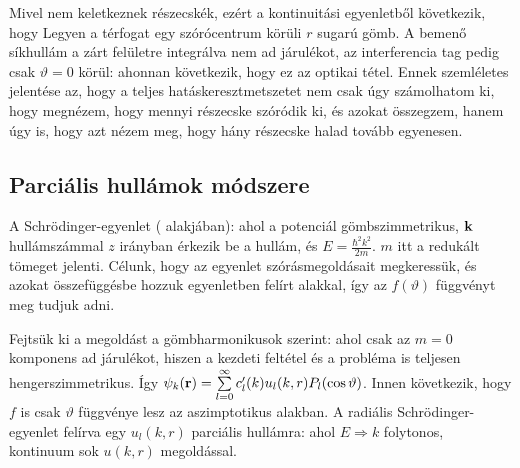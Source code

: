    Mivel nem keletkeznek részecskék, ezért a kontinuitási egyenletből következik, hogy
   Legyen a térfogat egy szórócentrum körüli $r$ sugarú gömb. A bemenő síkhullám a zárt felületre integrálva nem ad járulékot, az interferencia tag pedig csak $\vartheta=0$ körül:
   ahonnan következik, hogy 
   ez az optikai tétel. Ennek szemléletes jelentése az, hogy a teljes hatáskeresztmetszetet nem csak úgy számolhatom ki, hogy megnézem, hogy mennyi részecske szóródik ki, és azokat összegzem, hanem úgy is, hogy azt nézem meg, hogy hány részecske halad tovább egyenesen.
  
  \subsection{Parciális hullámok módszere}
   
   A Schrödinger-egyenlet ( alakjában):
   ahol a potenciál gömbszimmetrikus, $\mathbf{k}$ hullámszámmal $z$ irányban érkezik be a hullám, és $E=\frac{\hbar^2 k^2}{2m}$. $m$ itt a redukált tömeget jelenti. Célunk, hogy az egyenlet szórásmegoldásait megkeressük, és azokat összefüggésbe hozzuk  egyenletben felírt alakkal, így az $f(\vartheta)$ függvényt meg tudjuk adni.
   
   Fejtsük ki a megoldást a gömbharmonikusok szerint: 
   ahol csak az $m=0$ komponens ad járulékot, hiszen a kezdeti feltétel és a probléma is teljesen hengerszimmetrikus. Így $\psi_k(\mathbf{r})=\sum\limits_{l=0}^{\infty}c'_{l}(k)u_{l}(k,r)P_l(\cos\vartheta)$. Innen következik, hogy $f$ is csak $\vartheta$ függvénye lesz az aszimptotikus alakban. A radiális Schrödinger-egyenlet felírva egy $u_l(k,r)$ parciális hullámra:
   ahol $E\Rightarrow k$ folytonos, kontinuum sok $u(k,r)$ megoldással. 
   
